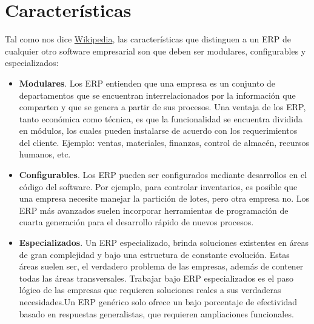 \chapter{Características}

Tal como nos dice \href{https://es.wikipedia.org/wiki/Sistema_de_planificaci%C3%B3n_de_recursos_empresariales#Definición}{Wikipedia}, las características que distinguen a un ERP de cualquier otro software empresarial son que deben ser modulares, configurables y especializados:

\begin{itemize}
    \item \textbf{Modulares}. Los ERP entienden que una empresa es un conjunto de departamentos que se encuentran interrelacionados por la información que comparten y que se genera a partir de sus procesos. Una ventaja de los ERP, tanto económica como técnica, es que la funcionalidad se encuentra dividida en módulos, los cuales pueden instalarse de acuerdo con los requerimientos del cliente. Ejemplo: ventas, materiales, finanzas, control de almacén, recursos humanos, etc.

    \item \textbf{Configurables}. Los ERP pueden ser configurados mediante desarrollos en el código del software. Por ejemplo, para controlar inventarios, es posible que una empresa necesite manejar la partición de lotes, pero otra empresa no. Los ERP más avanzados suelen incorporar herramientas de programación de cuarta generación para el desarrollo rápido de nuevos procesos.

    \item \textbf{Especializados}. Un ERP especializado, brinda soluciones existentes en áreas de gran complejidad y bajo una estructura de constante evolución. Estas áreas suelen ser, el verdadero problema de las empresas, además de contener todas las áreas transversales. Trabajar bajo ERP especializados es el paso lógico de las empresas que requieren soluciones reales a sus verdaderas necesidades.Un ERP genérico solo ofrece un bajo porcentaje de efectividad basado en respuestas generalistas, que requieren ampliaciones funcionales.
\end{itemize}

